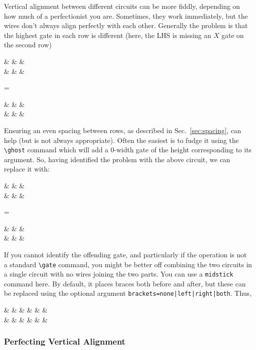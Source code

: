 \documentclass[aps,pra,10pt,nofootinbib]{revtex4-2}
\begin{document}
Vertical alignment between different circuits can be more fiddly, depending on how much of a perfectionist you are. Sometimes, they work immediately, but the wires don't always align perfectly with each other. Generally the problem is that the highest gate in each row is different (here, the LHS is missing an $X$ gate on the second row)
\begin{Code}
\begin{quantikz}
&  &  & \\
& & \targ{} &
\end{quantikz}
=\begin{quantikz}
&  &  & \\
& \targ{}  &  &
\end{quantikz}
\end{Code}
\noindent  Ensuring an even spacing between rows, as described in Sec.\ \ref{sec:spacing}, can help (but is not always appropriate). Often the easiest is to fudge it using the \verb!\ghost! command which will add a 0-width gate of the height corresponding to its argument. So, having identified the problem with the above circuit, we can replace it with:
\begin{Code}
\begin{quantikz}
&  &  & \\
&  & \targ{} &
\end{quantikz}
=\begin{quantikz}
&  &  & \\
& \targ{}  &  &
\end{quantikz}
\end{Code}

If you cannot identify the offending gate, and particularly if the operation is not a standard \verb!\gate! command, you might be better off combining the two circuits in a single circuit with no wires joining the two parts. You can use a \texttt{midstick} command here. By default, it places braces both before and after, but these can be replaced using the optional argument \texttt{brackets=none|left|right|both}. Thus,
\begin{Code}
\begin{quantikz}
& &  & \midstick[2,brackets=none]{=}&  &  & \\
&  & \targ{} & & \targ{}  &  &
\end{quantikz}
\end{Code}

 \subsubsection{Perfecting Vertical Alignment}
\end{document}

